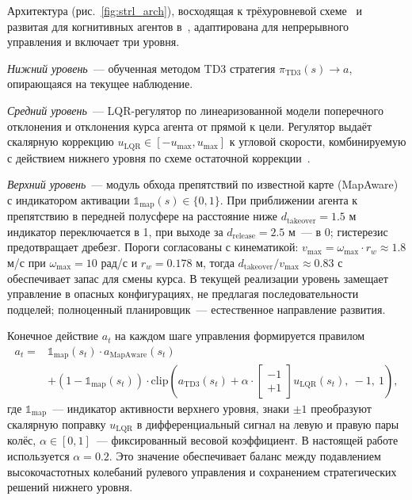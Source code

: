 \documentclass[11pt]{article}
\begin{document}
Архитектура (рис.~\ref{fig:strl_arch}), восходящая к трёхуровневой схеме~\cite{gat1998three} и развитая для когнитивных агентов в~\cite{kiselev2020dissertation,kiselev2020}, адаптирована для непрерывного управления и включает три уровня.

\textit{Нижний уровень}~--- обученная методом TD3 стратегия $\pi_{\mathrm{TD3}}(s) \to a$, опирающаяся на текущее наблюдение.

\textit{Средний уровень}~--- LQR-регулятор по линеаризованной модели поперечного отклонения и отклонения курса агента от прямой к цели. Регулятор выдаёт скалярную коррекцию $u_{\mathrm{LQR}} \in [-u_{\max}, u_{\max}]$ к угловой скорости, комбинируемую с действием нижнего уровня по схеме остаточной коррекции~\cite{silver2018residual,johannink2019residual}.

\textit{Верхний уровень}~--- модуль обхода препятствий по известной карте (MapAware) с индикатором активации $\mathbb{1}_{\mathrm{map}}(s) \in \{0, 1\}$. При приближении агента к препятствию в передней полусфере на расстояние ниже $d_{\mathrm{takeover}} = 1.5$ м индикатор переключается в 1, при выходе за $d_{\mathrm{release}} = 2.5$ м~--- в 0; гистерезис предотвращает дребезг. Пороги согласованы с кинематикой: $v_{\max} = \omega_{\max} \cdot r_w \approx 1.8$ м/с при $\omega_{\max} = 10$ рад/с и $r_w = 0.178$ м, тогда $d_{\mathrm{takeover}} / v_{\max} \approx 0.83$ с обеспечивает запас для смены курса. В текущей реализации уровень замещает управление в опасных конфигурациях, не предлагая последовательности подцелей; полноценный планировщик~--- естественное направление развития.

Конечное действие $a_t$ на каждом шаге управления формируется правилом
\begin{equation}
\label{eq:combine}
\begin{split}
a_t = {} & \mathbb{1}_{\mathrm{map}}(s_t) \cdot a_{\mathrm{MapAware}}(s_t) \\
& + (1 - \mathbb{1}_{\mathrm{map}}(s_t)) \cdot \mathrm{clip}\left( a_{\mathrm{TD3}}(s_t) + \alpha \cdot \begin{bmatrix} -1 \\ +1 \end{bmatrix} u_{\mathrm{LQR}}(s_t),\ -1,\ 1 \right),
\end{split}
\end{equation}
где $\mathbb{1}_{\text{map}}$~--- индикатор активности верхнего уровня,
знаки $\pm 1$ преобразуют скалярную поправку $u_{\mathrm{LQR}}$
в дифференциальный сигнал на левую и правую пары колёс, $\alpha \in [0, 1]$~---
фиксированный весовой коэффициент. В настоящей работе используется
$\alpha = 0.2$. Это значение обеспечивает баланс между подавлением
высокочастотных колебаний рулевого управления и сохранением стратегических
решений нижнего уровня.
\end{document}
